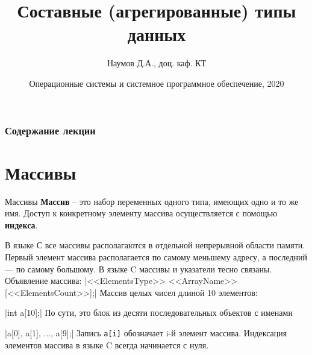 \documentclass{beamer}
\title[Язык C]{Составные (агрегированные) типы данных}
\author{Наумов Д.А., доц. каф. КТ}
\date[10.09.2020] {Операционные системы и системное программное обеспечение, 2020}
\begin{document}
\begin{frame}
  \titlepage
\end{frame}
  
\begin{frame}
  \frametitle{Содержание лекции}
  \tableofcontents  
\end{frame}

\section{Массивы}

\begin{frame}{Массивы}
    \textbf{Массив} -- это набор переменных одного типа, имеющих одно и то же имя. Доступ к конкретному элементу массива осуществляется с помощью \textbf{индекса}. 
    
    \medskip
    
    В языке С все массивы располагаются в отдельной непрерывной области памяти. Первый элемент массива располагается по самому меньшему адресу, а последний — по самому большому. В языке C массивы и указатели тесно связаны. 
    \medskip
    Объявление массива:
    |<<ElementsType>> <<ArrayName>>[<<ElementsCount>>];|
    \medskip
    Массив целых чисел длиной 10 элементов:
    
    |int a[10];|
    \medskip
    По сути, это блок из десяти последовательных объектов с именами 
    
    |a[0], a[1], ..., a[9];|
    \medskip
    Запись \texttt{a[i]} обозначает i-й элемент массива. Индексация элементов массива в языке C всегда начинается с нуля.
\end{frame}
\end{document}
